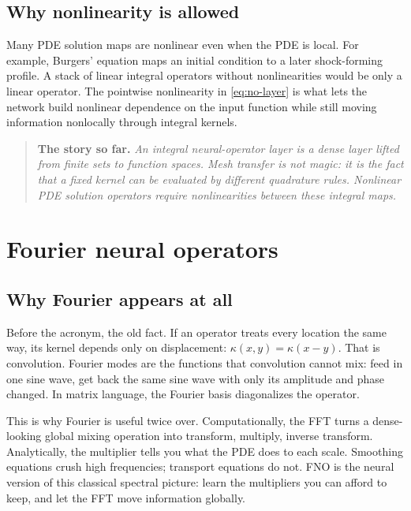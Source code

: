 \documentclass[10pt,a4paper]{article}
\newenvironment{recap}
{\par\medskip\noindent\begin{quote}\small\textbf{The story so far.}\itshape\;}
{\end{quote}\medskip}
\begin{document}
\subsection{Why nonlinearity is allowed}

Many PDE solution maps are nonlinear even when the PDE is local. For example,
Burgers' equation maps an initial condition to a later shock-forming profile.
A stack of linear integral operators without nonlinearities would be only a
linear operator. The pointwise nonlinearity in \eqref{eq:no-layer} is what
lets the network build nonlinear dependence on the input function while still
moving information nonlocally through integral kernels.

\begin{recap}
An integral neural-operator layer is a dense layer lifted from finite sets to
function spaces. Mesh transfer is not magic: it is the fact that a fixed
kernel can be evaluated by different quadrature rules. Nonlinear PDE solution
operators require nonlinearities between these integral maps.
\end{recap}

\section{Fourier neural operators}
\label{sec:fno}

\subsection*{Why Fourier appears at all}

Before the acronym, the old fact. If an operator treats every location the
same way, its kernel depends only on displacement: $\kappa(x,y) =
\kappa(x-y)$. That is convolution. Fourier modes are the functions that
convolution cannot mix: feed in one sine wave, get back the same sine wave
with only its amplitude and phase changed. In matrix language, the Fourier
basis diagonalizes the operator.

This is why Fourier is useful twice over. Computationally, the FFT turns a
dense-looking global mixing operation into transform, multiply, inverse
transform. Analytically, the multiplier tells you what the PDE does to each
scale. Smoothing equations crush high frequencies; transport equations do
not. FNO is the neural version of this classical spectral picture: learn the
multipliers you can afford to keep, and let the FFT move information globally.
\end{document}

